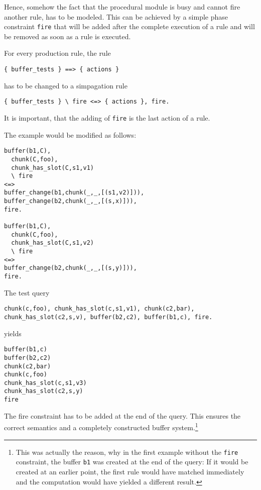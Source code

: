 Hence, somehow the fact that the procedural module is busy and cannot fire another rule, has to be modeled. This can be achieved by a simple phase constraint \verb|fire| that will be added after the complete execution of a rule and will be removed as soon as a rule is executed.

For every production rule, the rule

\begin{lstlisting}
{ buffer_tests } ==> { actions }
\end{lstlisting}

has to be changed to a simpagation rule

\begin{lstlisting}
{ buffer_tests } \ fire <=> { actions }, fire.
\end{lstlisting}

It is important, that the adding of \verb|fire| is the last action of a rule.

The example would be modified as follows:

\begin{lstlisting}
buffer(b1,C),
  chunk(C,foo),
  chunk_has_slot(C,s1,v1)
  \ fire
<=>
buffer_change(b1,chunk(_,_,[(s1,v2)])),
buffer_change(b2,chunk(_,_,[(s,x)])),
fire.

buffer(b1,C),
  chunk(C,foo),
  chunk_has_slot(C,s1,v2)
  \ fire
<=>
buffer_change(b2,chunk(_,_,[(s,y)])),
fire.
\end{lstlisting}


The test query

\begin{lstlisting}
chunk(c,foo), chunk_has_slot(c,s1,v1), chunk(c2,bar), chunk_has_slot(c2,s,v), buffer(b2,c2), buffer(b1,c), fire.
\end{lstlisting}

yields

\begin{lstlisting}
buffer(b1,c)
buffer(b2,c2)
chunk(c2,bar)
chunk(c,foo)
chunk_has_slot(c,s1,v3)
chunk_has_slot(c2,s,y)
fire
\end{lstlisting}

The fire constraint has to be added at the end of the query. This ensures the correct semantics and a completely constructed buffer system.\footnote{This was actually the reason, why in the first example without the \texttt{fire} constraint, the buffer \texttt{b1} was created at the end of the query: If it would be created at an earlier point, the first rule would have matched immediately and the computation would have yielded a different result.}

